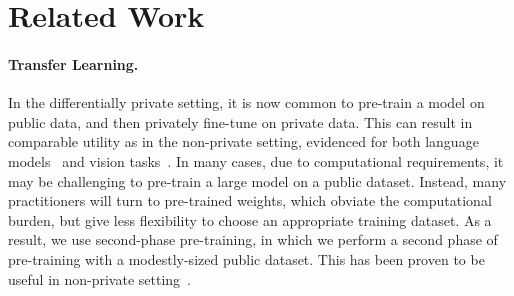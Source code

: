 \documentclass[11pt]{article}
\begin{document}
\begin{enumerate}
\end{enumerate}


\section{Related Work}

\paragraph{Transfer Learning.} In the differentially private setting, it is now common to pre-train a model on public data, and then privately fine-tune on private data.
This can result in comparable utility as in the non-private setting, evidenced for both language models~\cite{donot, YuNBGIKKLMWYZ22, LiTLH22} and vision tasks~\cite{cvpr,DeBHSB22,MehtaTKC22}. 
In many cases, due to computational requirements, it may be challenging to pre-train a large model on a public dataset.
Instead, many practitioners will turn to pre-trained weights, which obviate the computational burden, but give less flexibility to choose an appropriate training dataset.
As a result, we use second-phase pre-training, in which we perform a second phase of pre-training with a modestly-sized public dataset. This has been proven to be useful in non-private setting~\cite{dontstop}.
\end{document}
